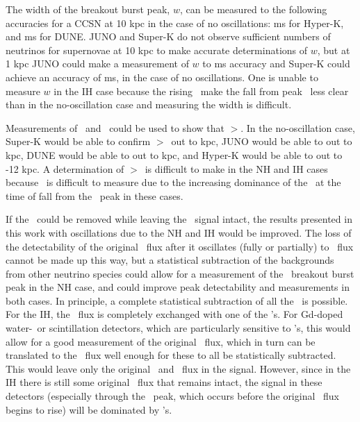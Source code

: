 The width of the breakout burst peak, $w$, can be measured to the
following accuracies for a CCSN at 10 kpc in the case of no
oscillations:  ms for Hyper-K, and  ms for DUNE.  JUNO and Super-K do not observe sufficient numbers of
neutrinos for supernovae at 10 kpc to make accurate determinations of
$w$, but at 1 kpc JUNO could make a measurement of $w$ to  ms
accuracy and Super-K could achieve an accuracy of  ms, in the case of no oscillations.  One is unable to measure
$w$ in the IH case because the rising \backgrounds\ make the fall from
peak \nue\ less clear than in the no-oscillation case and measuring
the width is difficult.

Measurements of \trise\ and \tfall\ could be used
to show that \tfall$>$\trise.    In the
no-oscillation case, 
Super-K would be able to confirm  \tfall$>$\trise\ out to  kpc, JUNO would be able to out to  kpc, 
DUNE would be able to out to  kpc, and Hyper-K would be able to
out to -12 kpc.  A
determination of \tfall$>$\trise\ is difficult to make in the NH and
IH cases because \tfall\ is difficult to measure due to 
the increasing dominance of the \backgrounds\ at
the time of fall from the \nue\ peak in these cases.



If the \backgrounds\ could be removed while leaving the \nue\ signal intact, 
the results presented in this work with oscillations due to the NH and
IH would be improved.
 The loss of the detectability of the
original \nue\ flux after it oscillates (fully or partially) to
\nuxpart\ flux cannot be made up this way, but a statistical subtraction
of the backgrounds from other neutrino species could allow for a
measurement of the \nue\ breakout burst peak in the NH case, and could improve peak detectability
and measurements in both cases.  In principle, a complete statistical
subtraction of all the \backgrounds\ is possible.
For the IH, the \anue\ flux is completely exchanged with one of 
the \nuxanti's.  For Gd-doped water-\cer\ or scintillation detectors,
which are particularly sensitive to \anue's,
this would allow for a good measurement of the original \nuxanti\ flux, 
which in turn can be translated to the \nuxpart\ flux well enough for
these to all be statistically subtracted.  This would leave only the
original \nue\ and \anue\ flux in the signal.
 However, since in the IH there is still some original \nue\ flux 
that remains intact, the signal in these detectors (especially through
the \nue\ peak, which occurs before the original \anue\ flux begins to
rise) will be dominated by \nue's.

